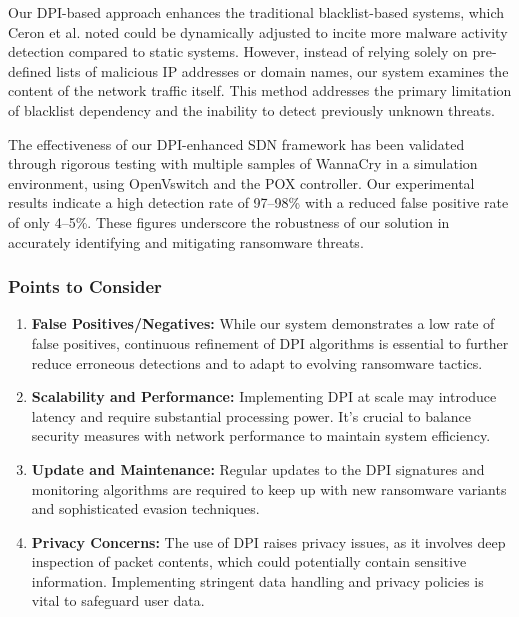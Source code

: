 \documentclass[12pt,letterpaper]{article}
\begin{document}
    Our DPI-based approach enhances the traditional blacklist-based systems, which Ceron et al. \cite{7543792} noted could be dynamically adjusted to incite more malware activity detection compared to static systems. However, instead of relying solely on pre-defined lists of malicious IP addresses or domain names, our system examines the content of the network traffic itself. This method addresses the primary limitation of blacklist dependency and the inability to detect previously unknown threats.

    The effectiveness of our DPI-enhanced SDN framework has been validated through rigorous testing with multiple samples of WannaCry in a simulation environment, using OpenVswitch and the POX controller. Our experimental results indicate a high detection rate of 97–98\% with a reduced false positive rate of only 4–5\%. These figures underscore the robustness of our solution in accurately identifying and mitigating ransomware threats.

    \subsubsection{Points to Consider}

    \begin{enumerate}
    
        \item \textbf{False Positives/Negatives:} While our system demonstrates a low rate of false positives, continuous refinement of DPI algorithms is essential to further reduce erroneous detections and to adapt to evolving ransomware tactics.


        \item \textbf{Scalability and Performance:} Implementing DPI at scale may introduce latency and require substantial processing power. It's crucial to balance security measures with network performance to maintain system efficiency.
        
        \item \textbf{Update and Maintenance:} Regular updates to the DPI signatures and monitoring algorithms are required to keep up with new ransomware variants and sophisticated evasion techniques.
        
        \item \textbf{Privacy Concerns:} The use of DPI raises privacy issues, as it involves deep inspection of packet contents, which could potentially contain sensitive information. Implementing stringent data handling and privacy policies is vital to safeguard user data.
    \end{enumerate}
\end{document}
